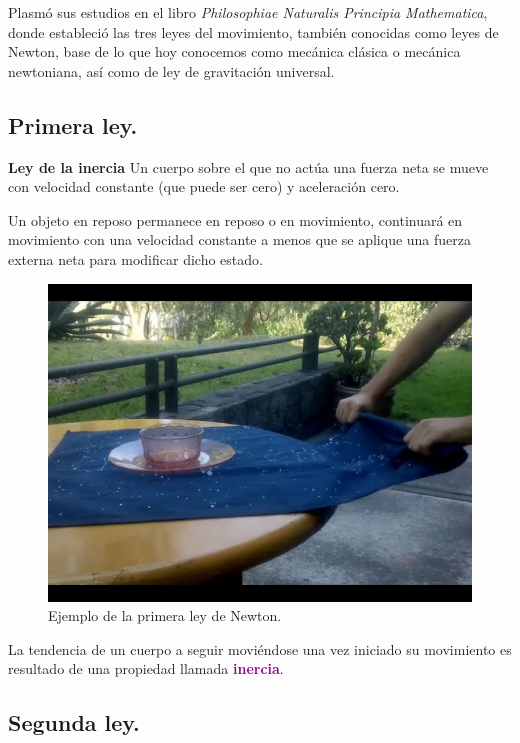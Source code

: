 \documentclass[14pt]{extarticle}
\newcommand{\textocolor}[2]{\textbf{\textcolor{#1}{#2}}}
\begin{document}
Plasmó sus estudios en el libro \emph{Philosophiae Naturalis Principia Mathematica}, donde estableció las tres leyes del movimiento, también conocidas como leyes de Newton, base de lo que hoy conocemos como mecánica clásica o mecánica newtoniana, así como de ley de gravitación universal.

\subsection{Primera ley.}

\textocolor{carmine}{Ley de la inercia} Un cuerpo sobre el que no actúa una fuerza neta se mueve con velocidad constante (que puede ser cero) y aceleración cero.

Un objeto en reposo permanece en reposo o en movimiento, continuará en movimiento con una velocidad constante a menos que se aplique una fuerza externa neta para modificar dicho estado.

\begin{figure}[H]
    \centering
    \includegraphics[scale=0.35]{Imagenes/Newton_01.jpg}
    \caption{Ejemplo de la primera ley de Newton.}
\end{figure}

La tendencia de un cuerpo a seguir moviéndose una vez iniciado su movimiento es resultado de una propiedad llamada \textocolor{darkmagenta}{inercia}.


\subsection{Segunda ley.}
\end{document}
